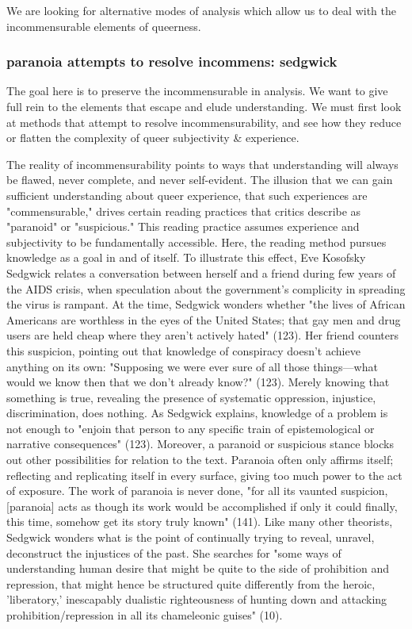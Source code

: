 \documentclass[11pt]{article}
\begin{document}
We are looking for alternative modes of analysis which allow us to
deal with the incommensurable elements of queerness.

\subsubsection{paranoia attempts to resolve incommens: sedgwick}
\label{sec:orgb68eec7}

The goal here is to preserve the incommensurable in analysis. We want
to give full rein to the elements that escape and elude
understanding. We must first look at methods that attempt to resolve
incommensurability, and see how they reduce or flatten the complexity
of queer subjectivity \& experience.

The reality of incommensurability points to ways that understanding
will always be flawed, never complete, and never self-evident. The
illusion that we can gain sufficient understanding about queer
experience, that such experiences are "commensurable," drives certain
reading practices that critics describe as "paranoid" or "suspicious."
This reading practice assumes experience and subjectivity to be
fundamentally accessible. Here, the reading method pursues knowledge
as a goal in and of itself. To illustrate this effect, Eve Kosofsky
Sedgwick relates a conversation between herself and a friend during
few years of the AIDS crisis, when speculation about the government's
complicity in spreading the virus is rampant. At the time, Sedgwick
wonders whether "the lives of African Americans are worthless in the
eyes of the United States; that gay men and drug users are held cheap
where they aren't actively hated" (123). Her friend counters this
suspicion, pointing out that knowledge of conspiracy doesn't achieve
anything on its own: "Supposing we were ever sure of all those
things---what would we know then that we don't already know?"
(123). Merely knowing that something is true, revealing the presence
of systematic oppression, injustice, discrimination, does nothing. As
Sedgwick explains, knowledge of a problem is not enough to "enjoin
that person to any specific train of epistemological or narrative
consequences" (123). Moreover, a paranoid or suspicious stance blocks
out other possibilities for relation to the text. Paranoia often only
affirms itself; reflecting and replicating itself in every surface,
giving too much power to the act of exposure. The work of paranoia is
never done, "for all its vaunted suspicion, [paranoia] acts as though
its work would be accomplished if only it could finally, this time,
somehow get its story truly known" (141). Like many other theorists,
Sedgwick wonders what is the point of continually trying to reveal,
unravel, deconstruct the injustices of the past. She searches for
"some ways of understanding human desire that might be quite to the
side of prohibition and repression, that might hence be structured
quite differently from the heroic, 'liberatory,' inescapably dualistic
righteousness of hunting down and attacking prohibition/repression in
all its chameleonic guises" (10).
\end{document}
